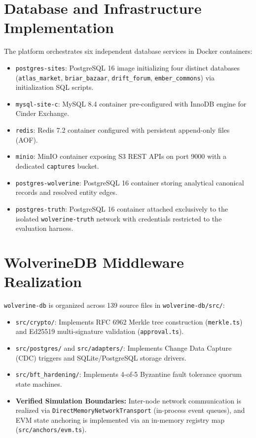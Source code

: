 \section{Database and Infrastructure Implementation}
\label{sec:impl-database}
The platform orchestrates six independent database services in Docker containers:
\begin{itemize}
    \item \texttt{postgres-sites}: PostgreSQL 16 image initializing four distinct databases (\texttt{atlas\_market}, \texttt{briar\_bazaar}, \texttt{drift\_forum}, \texttt{ember\_commons}) via initialization SQL scripts.
    \item \texttt{mysql-site-c}: MySQL 8.4 container pre-configured with InnoDB engine for Cinder Exchange.
    \item \texttt{redis}: Redis 7.2 container configured with persistent append-only files (AOF).
    \item \texttt{minio}: MinIO container exposing S3 REST APIs on port 9000 with a dedicated \texttt{captures} bucket.
    \item \texttt{postgres-wolverine}: PostgreSQL 16 container storing analytical canonical records and resolved entity edges.
    \item \texttt{postgres-truth}: PostgreSQL 16 container attached exclusively to the isolated \texttt{wolverine-truth} network with credentials restricted to the evaluation harness.
\end{itemize}

\section{WolverineDB Middleware Realization}
\label{sec:impl-wolverinedb}
\texttt{wolverine-db} is organized across 139 source files in \texttt{wolverine-db/src/}:
\begin{itemize}
    \item \texttt{src/crypto/}: Implements RFC 6962 Merkle tree construction (\texttt{merkle.ts}) and Ed25519 multi-signature validation (\texttt{approval.ts}).
    \item \texttt{src/postgres/} and \texttt{src/adapters/}: Implements Change Data Capture (CDC) triggers and SQLite/PostgreSQL storage drivers.
    \item \texttt{src/bft\_hardening/}: Implements 4-of-5 Byzantine fault tolerance quorum state machines.
    \item \textbf{Verified Simulation Boundaries:} Inter-node network communication is realized via \texttt{DirectMemoryNetworkTransport} (in-process event queues), and EVM state anchoring is implemented via an in-memory registry map (\texttt{src/anchors/evm.ts}).
\end{itemize}

